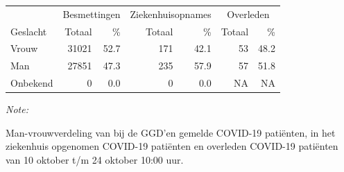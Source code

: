 \documentclass[
  english,
  man,floatsintext]{apa6}
\begin{document}
\begin{table}
\centering\begingroup\fontsize{11}{13}\selectfont

\begin{threeparttable}
\begin{tabular}{lrrrrrr}
\toprule
\multicolumn{1}{c}{ } & \multicolumn{2}{c}{Besmettingen} & \multicolumn{2}{c}{Ziekenhuisopnames} & \multicolumn{2}{c}{Overleden} \\
\cmidrule(l{3pt}r{3pt}){2-3} \cmidrule(l{3pt}r{3pt}){4-5} \cmidrule(l{3pt}r{3pt}){6-7}
Geslacht & Totaal & \% & Totaal & \% & Totaal & \%\\
\midrule
Vrouw & 31021 & 52.7 & 171 & 42.1 & 53 & 48.2\\
Man & 27851 & 47.3 & 235 & 57.9 & 57 & 51.8\\
Onbekend & 0 & 0.0 & 0 & 0.0 & NA & NA\\
\bottomrule
\end{tabular}
\begin{tablenotes}
\item \textit{Note: } 
\item Man-vrouwverdeling van bij de GGD’en gemelde COVID-19 patiënten, in het ziekenhuis opgenomen COVID-19 patiënten en overleden COVID-19 patiënten van 10 oktober t/m 24 oktober 10:00 uur.
\end{tablenotes}
\end{threeparttable}
\endgroup{}
\end{table}
\newpage
\end{document}
